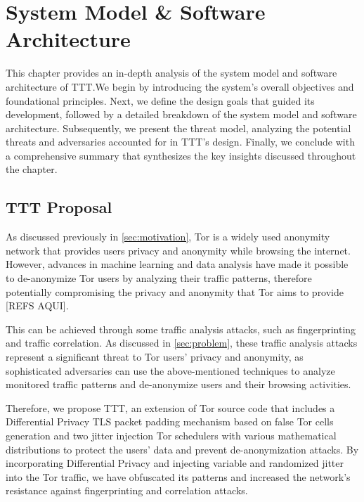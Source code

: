 
%

\makeatletter
\newcommand{\ntifpkgloaded}{%
  \@ifpackageloaded%
}
\makeatother


\chapter{System Model \& Software Architecture}\label{cha:system_model}

This chapter provides an in-depth analysis of the system model and software architecture of TTT.\@ We begin by introducing the system's overall objectives and foundational principles. Next, we define the design goals that guided its development, followed by a detailed breakdown of the system model and software architecture. Subsequently, we present the threat model, analyzing the potential threats and adversaries accounted for in TTT's design. Finally, we conclude with a comprehensive summary that synthesizes the key insights discussed throughout the chapter.

\section{TTT Proposal}\label{sec:system_propostal}

As discussed previously in \autoref{sec:motivation}, Tor is a widely used anonymity network that provides users privacy and anonymity while browsing the internet. However, advances in machine learning and data analysis have made it possible to de-anonymize Tor users by analyzing their traffic patterns, therefore potentially  compromising the privacy and anonymity that Tor aims to provide [REFS AQUI]. 

This can be achieved through some traffic analysis attacks, such as fingerprinting and traffic correlation. As discussed in \autoref{sec:problem}, these traffic analysis attacks represent a significant threat to Tor users' privacy and anonymity, as sophisticated adversaries can use the above-mentioned techniques to analyze monitored traffic patterns and de-anonymize users and their browsing activities.

Therefore, we propose TTT, an extension of Tor source code that includes a Differential Privacy TLS packet padding mechanism based on false Tor cells generation and two jitter injection Tor schedulers with various mathematical distributions to protect the users' data and prevent de-anonymization attacks. By incorporating Differential Privacy and injecting variable and randomized jitter into the Tor traffic, we have obfuscated its patterns and increased the network's resistance against fingerprinting and correlation attacks.

